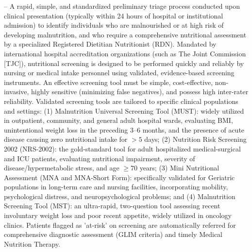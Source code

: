 -- A rapid, simple, and standardized preliminary triage process conducted upon clinical presentation (typically within 24 hours of hospital or institutional admission) to identify individuals who are malnourished or at high risk of developing malnutrition, and who require a comprehensive nutritional assessment by a specialized Registered Dietitian Nutritionist (RDN). Mandated by international hospital accreditation organizations (such as The Joint Commission [TJC]), nutritional screening is designed to be performed quickly and reliably by nursing or medical intake personnel using validated, evidence-based screening instruments. An effective screening tool must be simple, cost-effective, non-invasive, highly sensitive (minimizing false negatives), and possess high inter-rater reliability. Validated screening tools are tailored to specific clinical populations and settings: (1) Malnutrition Universal Screening Tool (MUST): widely utilized in outpatient, community, and general adult hospital wards, evaluating BMI, unintentional weight loss in the preceding 3--6 months, and the presence of acute disease causing zero nutritional intake for $>5$ days; (2) Nutrition Risk Screening 2002 (NRS-2002): the gold-standard tool for adult hospitalized medical-surgical and ICU patients, evaluating nutritional impairment, severity of disease/hypermetabolic stress, and age $\ge 70$ years; (3) Mini Nutritional Assessment (MNA and MNA-Short Form): specifically validated for Geriatric populations in long-term care and nursing facilities, incorporating mobility, psychological distress, and neuropsychological problems; and (4) Malnutrition Screening Tool (MST): an ultra-rapid, two-question tool assessing recent involuntary weight loss and poor recent appetite, widely utilized in oncology clinics. Patients flagged as 'at-risk' on screening are automatically referred for comprehensive diagnostic assessment (GLIM criteria) and timely Medical Nutrition Therapy.

